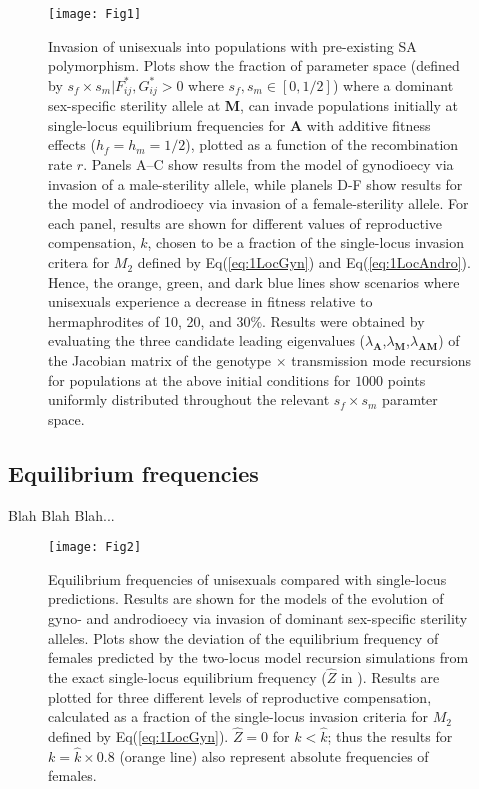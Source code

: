 \documentclass[9pt,twocolumn,twoside,lineno]{gsajnl}
\begin{document}
\begin{figure}[htbp]
\centering
\texttt{[image: Fig1]}
\caption{Invasion of unisexuals into populations with pre-existing SA polymorphism. Plots show the fraction of parameter space (defined by $s_f \times s_m | F^{\ast}_{ij},G^{\ast}_{ij} > 0$ where $s_f,s_m \in [0,1/2]$) where a dominant sex-specific sterility allele at $\mathbf{M}$, can invade populations initially at single-locus equilibrium frequencies for $\mathbf{A}$ with additive fitness effects ($h_f=h_m=1/2$), plotted as a function of the recombination rate $r$. Panels A--C show results from the model of gynodioecy via invasion of a male-sterility allele, while planels D-F show results for the model of androdioecy via invasion of a female-sterility allele. For each panel, results are shown for different values of reproductive compensation, $k$, chosen to be a fraction of the single-locus invasion critera for $M_2$ defined by Eq(\ref{eq:1LocGyn}) and Eq(\ref{eq:1LocAndro}). Hence, the orange, green, and dark blue lines show scenarios where unisexuals experience a decrease in fitness relative to hermaphrodites of 10, 20, and 30\%. Results were obtained by evaluating the three candidate leading eigenvalues ($\lambda_{\mathbf{A}}$,$\lambda_{\mathbf{M}}$,$\lambda_{\mathbf{AM}}$) of the Jacobian matrix of the genotype $\times$ transmission mode recursions for populations at the above initial conditions for $1000$ points uniformly distributed throughout the relevant $s_f \times s_m$ paramter space.}
\label{fig:PrInv}
\end{figure}


\subsection{Equilibrium frequencies}

Blah Blah Blah...

\begin{figure}[htbp]
\centering
\texttt{[image: Fig2]}
\caption{Equilibrium frequencies of unisexuals compared with single-locus predictions. Results are shown for the models of the evolution of gyno- and androdioecy via invasion of dominant sex-specific sterility alleles. Plots show the deviation of the equilibrium frequency of females predicted by the two-locus model recursion simulations from the exact single-locus equilibrium frequency ($\hat{Z}$ in \citealt{Charlesworth1978a}). Results are plotted for three different levels of reproductive compensation, calculated as a fraction of the single-locus invasion criteria for $M_2$ defined by Eq(\ref{eq:1LocGyn}). $\hat{Z} = 0$ for $k < \hat{k}$; thus the results for $k = \hat{k} \times 0.8$ (orange line) also represent absolute frequencies of females.}
\label{fig:eqFem}
\end{figure}
\end{document}
